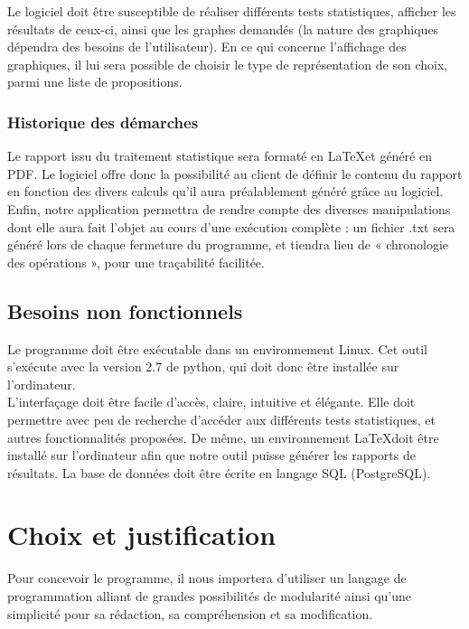 \documentclass[a4paper]{report}
\begin{document}
Le logiciel doit être susceptible de réaliser différents tests statistiques, afficher les résultats de ceux-ci, ainsi que les graphes demandés (la nature des graphiques dépendra des besoins de l'utilisateur). En ce qui concerne l’affichage des graphiques, il lui sera possible de choisir le type de représentation de son choix, parmi une liste de propositions.

\subsubsection{Historique des démarches}

Le rapport issu du traitement statistique sera formaté en \LaTeX et généré en PDF. Le logiciel offre donc la possibilité au client de définir le contenu du rapport en fonction des divers calculs qu’il aura préalablement généré grâce au logiciel. \\
Enfin, notre application permettra de rendre compte des diverses manipulations dont elle aura fait l’objet au cours d’une exécution complète : un fichier .txt sera généré lors de chaque fermeture du programme, et tiendra lieu de  « chronologie des opérations », pour une traçabilité facilitée.


\subsection{Besoins non fonctionnels}

Le programme doit être exécutable dans un environnement Linux. Cet outil s'exécute avec la version 2.7 de python, qui doit donc être installée sur l'ordinateur.\\
L'interfaçage doit être facile d'accès, claire, intuitive et élégante. Elle doit permettre avec peu de recherche d'accéder aux différents tests statistiques, et autres fonctionnalités proposées. De même, un environnement \LaTeX doit être installé sur l'ordinateur afin que notre outil puisse générer les rapports de résultats. La base de données doit être écrite en langage SQL (PostgreSQL).


\section{Choix et justification}

Pour concevoir le programme, il nous importera d'utiliser un langage de programmation alliant de grandes possibilités de modularité ainsi qu'une simplicité pour sa rédaction, sa compréhension et sa modification.\\
\end{document}
